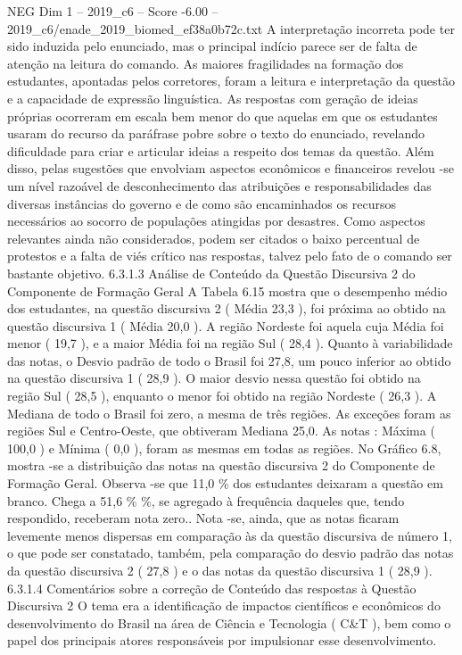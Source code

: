 \begin{textsample}{NEG Dim 1 – 2019\_c6 – Score -6.00 – 2019\_c6/enade\_2019\_biomed\_ef38a0b72c.txt}
A interpretação incorreta pode ter sido induzida pelo enunciado, mas o principal indício parece ser de falta de atenção na leitura do comando.
As maiores fragilidades na formação dos estudantes, apontadas pelos corretores, foram a leitura e interpretação da questão e a capacidade de expressão linguística.
As respostas com geração de ideias próprias ocorreram em escala bem menor do que aquelas em que os estudantes usaram do recurso da paráfrase pobre sobre o texto do enunciado, revelando dificuldade para criar e articular ideias a respeito dos temas da questão.
Além disso, pelas sugestões que envolviam aspectos econômicos e financeiros revelou -se um nível razoável de desconhecimento das atribuições e responsabilidades das diversas instâncias do governo e de como são encaminhados os recursos necessários ao socorro de populações atingidas por desastres.
Como aspectos relevantes ainda não considerados, podem ser citados o baixo percentual de protestos e a falta de viés crítico nas respostas, talvez pelo fato de o comando ser bastante objetivo. 6.3.1.3 Análise de Conteúdo da Questão Discursiva 2 do Componente de Formação Geral A Tabela 6.15 mostra que o desempenho médio dos estudantes, na questão discursiva 2 ( Média 23,3 ), foi próxima ao obtido na questão discursiva 1 ( Média 20,0 ).
A região Nordeste foi aquela cuja Média foi menor ( 19,7 ), e a maior Média foi na região Sul ( 28,4 ).
Quanto à variabilidade das notas, o Desvio padrão de todo o Brasil foi 27,8, um pouco inferior ao obtido na questão discursiva 1 ( 28,9 ).
O maior desvio nessa questão foi obtido na região Sul ( 28,5 ), enquanto o menor foi obtido na região Nordeste ( 26,3 ).
A Mediana de todo o Brasil foi zero, a mesma de três regiões.
As exceções foram as regiões Sul e Centro-Oeste, que obtiveram Mediana 25,0.
As notas : Máxima ( 100,0 ) e Mínima ( 0,0 ), foram as mesmas em todas as regiões.
No Gráfico 6.8, mostra -se a distribuição das notas na questão discursiva 2 do Componente de Formação Geral.
Observa -se que 11,0 \% dos estudantes deixaram a questão em branco.
Chega a 51,6 \% \%, se agregado à frequência daqueles que, tendo respondido, receberam nota zero..
Nota -se, ainda, que as notas ficaram levemente menos dispersas em comparação às da questão discursiva de número 1, o que pode ser constatado, também, pela comparação do desvio padrão das notas da questão discursiva 2 ( 27,8 ) e o das notas da questão discursiva 1 ( 28,9 ). 6.3.1.4 Comentários sobre a correção de Conteúdo das respostas à Questão Discursiva 2 O tema era a identificação de impactos científicos e econômicos do desenvolvimento do Brasil na área de Ciência e Tecnologia ( C\&T ), bem como o papel dos principais atores responsáveis por impulsionar esse desenvolvimento.

\end{textsample}

